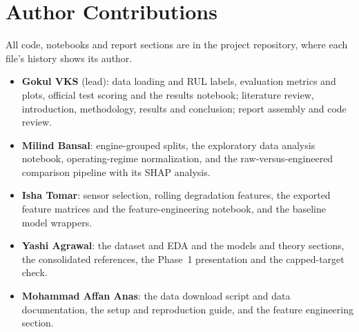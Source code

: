 
\section*{Author Contributions}
All code, notebooks and report sections are in the project repository, where each
file's history shows its author.
\begin{itemize}
\item \textbf{Gokul VKS} (lead): data loading and RUL labels, evaluation metrics
  and plots, official test scoring and the results notebook; literature review,
  introduction, methodology, results and conclusion; report assembly and code
  review.
\item \textbf{Milind Bansal}: engine-grouped splits, the exploratory data
  analysis notebook, operating-regime normalization, and the raw-versus-engineered
  comparison pipeline with its SHAP analysis.
\item \textbf{Isha Tomar}: sensor selection, rolling degradation features, the
  exported feature matrices and the feature-engineering notebook, and the
  baseline model wrappers.
\item \textbf{Yashi Agrawal}: the dataset and EDA and the models and theory
  sections, the consolidated references, the Phase~1 presentation and the
  capped-target check.
\item \textbf{Mohammad Affan Anas}: the data download script and data
  documentation, the setup and reproduction guide, and the feature engineering
  section.
\end{itemize}
